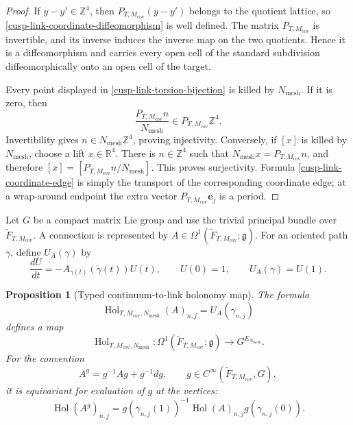 \documentclass[11pt]{article}
\newtheorem{proposition}[theorem]{Proposition}
\theoremstyle{definition}
\numberwithin{equation}{section}
\begin{document}
\begin{proof}
If \(y-y'\in\mathbb Z^4\), then
\(P_{T,M_{\mathrm{cov}}}(y-y')\) belongs to the quotient lattice, so
\eqref{cusp-link-coordinate-diffeomorphism} is well defined.  The matrix
\(P_{T,M_{\mathrm{cov}}}\) is invertible, and its inverse induces the
inverse map on the two quotients.  Hence it is a diffeomorphism and carries
every open cell of the standard subdivision diffeomorphically onto an open
cell of the target.

Every point displayed in \eqref{cusp-link-torsion-bijection} is killed by
\(N_{\mathrm{mesh}}\).  If it is zero, then
\[
 \frac{P_{T,M_{\mathrm{cov}}}n}{N_{\mathrm{mesh}}}
 \in P_{T,M_{\mathrm{cov}}}\mathbb Z^4.
\]
Invertibility gives
\(n\in N_{\mathrm{mesh}}\mathbb Z^4\), proving injectivity.  Conversely,
if \([x]\) is killed by \(N_{\mathrm{mesh}}\), choose a lift
\(x\in\mathbb R^4\).  There is \(n\in\mathbb Z^4\) such that
\(N_{\mathrm{mesh}}x=P_{T,M_{\mathrm{cov}}}n\), and therefore
\([x]=[P_{T,M_{\mathrm{cov}}}n/N_{\mathrm{mesh}}]\).  This proves
surjectivity.  Formula \eqref{cusp-link-coordinate-edge} is simply the
transport of the corresponding coordinate edge; at a wrap-around endpoint
the extra vector \(P_{T,M_{\mathrm{cov}}}\mathbf e_j\) is a period.
\end{proof}

Let \(G\) be a compact matrix Lie group and use the trivial principal bundle over
\(\widetilde F_{T,M_{\mathrm{cov}}}\).  A connection is represented by
\(A\in\Omega^1(\widetilde F_{T,M_{\mathrm{cov}}};\mathfrak g)\).  For an
oriented path \(\gamma\), define \(U_A(\gamma)\) by
\begin{equation}
 \frac{dU}{dt}=-A_{\gamma(t)}(\dot\gamma(t))U(t),
 \qquad U(0)=1,
 \qquad U_A(\gamma)=U(1).
 \label{cusp-link-parallel-transport-ode}
\end{equation}

\begin{proposition}[Typed continuum-to-link holonomy map]
\label{cusp-link-holonomy-map}
The formula
\begin{equation}
 \operatorname{Hol}_{T,M_{\mathrm{cov}},N_{\mathrm{mesh}}}(A)_{n,j}
 =U_A(\gamma_{n,j})
 \label{cusp-link-holonomy-definition}
\end{equation}
defines a map
\begin{equation}
 \operatorname{Hol}_{T,M_{\mathrm{cov}},N_{\mathrm{mesh}}}:
 \Omega^1(\widetilde F_{T,M_{\mathrm{cov}}};\mathfrak g)
 \longrightarrow G^{E_{N_{\mathrm{mesh}}}}.
 \label{cusp-link-holonomy-typed}
\end{equation}
For the convention
\begin{equation}
 A^g=g^{-1}Ag+g^{-1}dg,
 \qquad
 g\in C^\infty(\widetilde F_{T,M_{\mathrm{cov}}},G),
 \label{cusp-link-gauge-convention}
\end{equation}
it is equivariant for evaluation of \(g\) at the vertices:
\begin{equation}
 \operatorname{Hol}(A^g)_{n,j}
 =g(\gamma_{n,j}(1))^{-1}
  \operatorname{Hol}(A)_{n,j}
  g(\gamma_{n,j}(0)).
 \label{cusp-link-holonomy-equivariance}
\end{equation}
\end{proposition}
\end{document}
